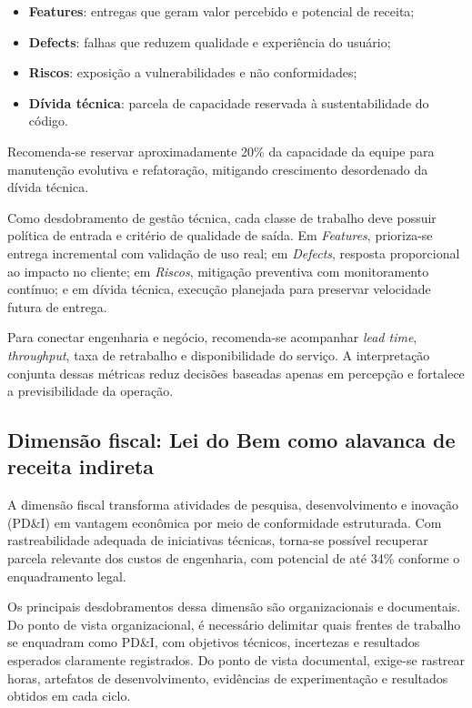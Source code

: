 \begin{itemize}
    \item \textbf{Features}: entregas que geram valor percebido e potencial de receita;
    \item \textbf{Defects}: falhas que reduzem qualidade e experiência do usuário;
    \item \textbf{Riscos}: exposição a vulnerabilidades e não conformidades;
    \item \textbf{Dívida técnica}: parcela de capacidade reservada à sustentabilidade do código.
\end{itemize}

Recomenda-se reservar aproximadamente 20\% da capacidade da equipe para manutenção evolutiva e refatoração, mitigando crescimento desordenado da dívida técnica.

Como desdobramento de gestão técnica, cada classe de trabalho deve possuir política de entrada e critério de qualidade de saída. Em \textit{Features}, prioriza-se entrega incremental com validação de uso real; em \textit{Defects}, resposta proporcional ao impacto no cliente; em \textit{Riscos}, mitigação preventiva com monitoramento contínuo; e em dívida técnica, execução planejada para preservar velocidade futura de entrega.

Para conectar engenharia e negócio, recomenda-se acompanhar \textit{lead time}, \textit{throughput}, taxa de retrabalho e disponibilidade do serviço. A interpretação conjunta dessas métricas reduz decisões baseadas apenas em percepção e fortalece a previsibilidade da operação.

\subsection{Dimensão fiscal: Lei do Bem como alavanca de receita indireta}

A dimensão fiscal transforma atividades de pesquisa, desenvolvimento e inovação (PD\&I) em vantagem econômica por meio de conformidade estruturada. Com rastreabilidade adequada de iniciativas técnicas, torna-se possível recuperar parcela relevante dos custos de engenharia, com potencial de até 34\% conforme o enquadramento legal.

Os principais desdobramentos dessa dimensão são organizacionais e documentais. Do ponto de vista organizacional, é necessário delimitar quais frentes de trabalho se enquadram como PD\&I, com objetivos técnicos, incertezas e resultados esperados claramente registrados. Do ponto de vista documental, exige-se rastrear horas, artefatos de desenvolvimento, evidências de experimentação e resultados obtidos em cada ciclo.

